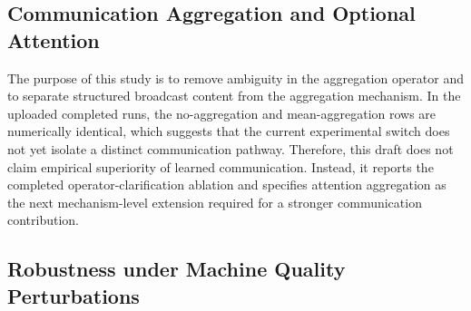\documentclass[preprint,12pt]{elsarticle}
\begin{document}
\subsection{Communication Aggregation and Optional Attention}


\begin{table}[htbp]
\centering
\caption{Communication aggregation ablation. The completed runs contain no-aggregation and mean-aggregation variants. Their identical values indicate that the present structured broadcast is not the dominant factor in the default 5$\times$5 setting; attention aggregation and auxiliary experience loss are specified as future implementable extensions rather than reported results.}
\label{tab:comm_agg}
\end{table}


The purpose of this study is to remove ambiguity in the aggregation operator and to separate structured broadcast content from the aggregation mechanism. In the uploaded completed runs, the no-aggregation and mean-aggregation rows are numerically identical, which suggests that the current experimental switch does not yet isolate a distinct communication pathway. Therefore, this draft does not claim empirical superiority of learned communication. Instead, it reports the completed operator-clarification ablation and specifies attention aggregation as the next mechanism-level extension required for a stronger communication contribution.

\subsection{Robustness under Machine Quality Perturbations}
\end{document}
